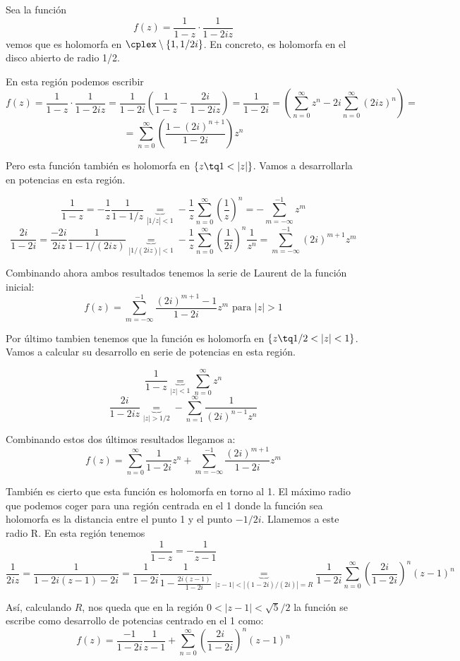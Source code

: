 \documentclass{apuntes}
\begin{document}
\begin{example}
Sea la función
\[f(z)=\frac{1}{1-z}\cdot \frac{1}{1-2iz}\]
vemos que es holomorfa en $\cplex\setminus\{1,1/2i\}$. En concreto, es holomorfa en el disco abierto de radio 1/2.

En esta región podemos escribir
\[f(z)=\frac{1}{1-z}\cdot \frac{1}{1-2iz} = \frac{1}{1-2i}\left(\frac{1}{1-z}-\frac{2i}{1-2iz} \right)=\frac{1}{1-2i}=\left(\sum_{n=0}^{\infty} z^n - 2i\sum_{n=0}^{\infty}(2iz)^n \right)=\]
\[=\sum_{n=0}^{\infty}\left(\frac{1-(2i)^{n+1}}{1-2i}\right)z^n\]

Pero esta función también es holomorfa en $\{z \tq 1<|z|\}$. Vamos a desarrollarla en potencias en esta región.

\[\frac{1}{1-z} = -\frac{1}{z}\frac{1}{1-1/z}\underbrace{=}_{|1/z|<1} -\frac{1}{z}\sum_{n=0}^{\infty}\left(\frac{1}{z}\right)^n = -\sum_{m=-\infty}^{-1}z^m\]
\[\frac{2i}{1-2i}= \frac{-2i}{2iz}\frac{1}{1-1/(2iz)} \underbrace{=}_{|1/(2iz)|<1} -\frac{1}{z}\sum_{n=0}^{\infty}\left(\frac{1}{2i}\right)^n\frac{1}{z^n}=\sum_{m=-\infty}^{-1}(2i)^{m+1}z^m\]

Combinando ahora ambos resultados tenemos la serie de Laurent de la función inicial:
\[f(z)=\sum_{m=-\infty}^{-1}\frac{(2i)^{m+1}-1}{1-2i}z^m \text{ para } |z| >1\]

Por último tambien tenemos que la función es holomorfa en $\{z \tq 1/2<|z|<1\}$. Vamos a calcular su desarrollo en serie de potencias en esta región.

\[\frac{1}{1-z} \underbrace{=}_{|z|<1} \sum_{n=0}^{\infty} z^n\]
\[\frac{2i}{1-2iz} \underbrace{=}_{|z|>1/2} - \sum_{n=1}^{\infty}\frac{1}{(2i)^{n-1}z^n}\]

Combinando estos dos últimos resultados llegamos a:
\[f(z)=\sum_{n=0}^{\infty}\frac{1}{1-2i}z^n+\sum_{m=-\infty}^{-1}\frac{(2i)^{m+1}}{1-2i}z^m\]

También es cierto que esta función es holomorfa en torno al 1. El máximo radio que podemos coger para una región centrada en el 1 donde la función sea holomorfa es la distancia entre el punto 1 y el punto $-1/2i$. Llamemos a este radio R. En esta región tenemos
\[\frac{1}{1-z} = -\frac{1}{z-1}\]
\[\frac{1}{2iz} = \frac{1}{1-2i(z-1)-2i} = \frac{1}{1-2i}\frac{1}{1-\frac{2i(z-1)}{1-2i}} \underbrace{=}_{|z-1|<|(1-2i)/(2i)|=R} \frac{1}{1-2i}\sum_{n=0}^{\infty} \left( \frac{2i}{1-2i}\right)^n (z-1)^n\]

Así, calculando $R$, nos queda que en la región $0<|z-1|<\sqrt{5}/2$ la función se escribe como desarrollo de potencias centrado en el 1 como:
\[f(z)=\frac{-1}{1-2i}\frac{1}{z-1}+\sum_{n=0}^{\infty}\left(\frac{2i}{1-2i} \right)^n(z-1)^n\]
\end{example}
\end{document}

